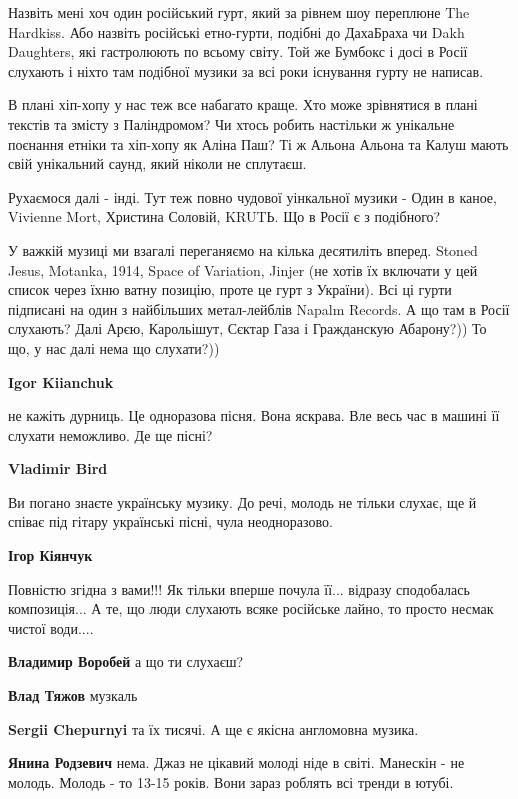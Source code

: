 \begin{itemize}
\begin{itemize}
Назвіть мені хоч один російський гурт, який за рівнем шоу переплюне The
Hardkiss. Або назвіть російські етно-гурти, подібні до ДахаБраха чи Dakh
Daughters, які гастролюють по всьому світу. Той же Бумбокс і досі в Росії
слухають і ніхто там подібної музики за всі роки існування гурту не написав.

В плані хіп-хопу у нас теж все набагато краще. Хто може зрівнятися в плані
текстів та змісту з Паліндромом? Чи хтось робить настільки ж унікальне поєнання
етніки та хіп-хопу як Аліна Паш? Ті ж Альона Альона та Калуш мають свій
унікальний саунд, який ніколи не сплутаєш.

Рухаємося далі - інді. Тут теж повно чудової уінкальної музики - Один в каное,
Vivienne Mort, Христина Соловій, KRUTЬ. Що в Росії є з подібного?

У важкій музиці ми взагалі переганяємо на кілька десятиліть вперед. Stoned
Jesus, Motanka, 1914, Space of Variation, Jinjer (не хотів їх включати у цей
список через їхню ватну позицію, проте це гурт з України). Всі ці гурти
підписані на один з найбільших метал-лейблів Napalm Records. А що там в Росії
слухають? Далі Арєю, Карольішут, Сєктар Газа і Гражданскую Абарону?)) То що, у
нас далі нема що слухати?))

\textbf{Igor Kiianchuk} 

не кажіть дурниць. Це одноразова пісня. Вона яскрава. Вле весь час в машині її
слухати неможливо. Де ще пісні?

\textbf{Vladimir Bird} 

Ви погано знаєте українську музику. До речі, молодь не тільки слухає, ще й
співає під гітару українські пісні, чула неодноразово.

\textbf{Ігор Кіянчук} 

Повністю згідна з вами!!! Як тільки вперше почула її... відразу сподобалась
композиція... А те, що люди слухають всяке російське лайно, то просто несмак
чистої води....

\textbf{Владимир Воробей} а що ти слухаєш?

\textbf{Влад Тяжов} музкаль

\textbf{Sergii Chepurnyi} та їх тисячі. А ще є якісна англомовна музика.

\textbf{Янина Родзевич} нема. Джаз не цікавий молоді ніде в світі. Манескін - не молодь. Молодь - то 13-15 років. Вони зараз роблять всі тренди в ютубі.


\end{itemize}
\end{itemize}
